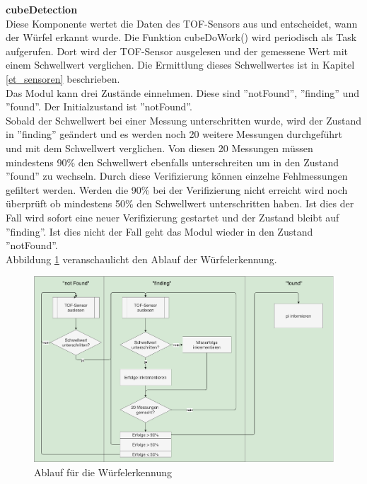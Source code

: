 \documentclass[../../main.tex]{subfiles}
\begin{document}
    \textbf{cubeDetection}\\
    Diese Komponente wertet die Daten des TOF-Sensors aus und entscheidet, wann der Würfel erkannt wurde. Die Funktion cubeDoWork() wird periodisch als Task aufgerufen. Dort wird der TOF-Sensor ausgelesen und der gemessene Wert mit einem Schwellwert verglichen. Die Ermittlung dieses Schwellwertes ist in Kapitel \ref{et_sensoren} beschrieben.\\
    Das Modul kann drei Zustände einnehmen. Diese sind ''notFound'', ''finding'' und ''found''. Der Initialzustand ist ''notFound''.\\
    Sobald der Schwellwert bei einer Messung unterschritten wurde, wird der Zustand in ''finding'' geändert und es werden noch 20 weitere Messungen durchgeführt und mit dem Schwellwert verglichen. Von diesen 20 Messungen müssen mindestens 90\% den Schwellwert ebenfalls unterschreiten um in den Zustand ''found'' zu wechseln. Durch diese Verifizierung können einzelne Fehlmessungen gefiltert werden. Werden die 90\% bei der Verifizierung nicht erreicht wird noch überprüft ob mindestens 50\% den Schwellwert unterschritten haben. Ist dies der Fall wird sofort eine neuer Verifizierung gestartet und der Zustand bleibt auf ''finding''. Ist dies nicht der Fall geht das Modul wieder in den Zustand ''notFound''.\\
    Abbildung \ref{fig:et_cube_detection_proc} veranschaulicht den Ablauf der Würfelerkennung.

    \begin{figure}[H]
        \centering
        \includegraphics[width=1.0\textwidth]{../../images/et/et_cube_detection_proc.pdf}
        \caption {Ablauf für die Würfelerkennung}
        \label{fig:et_cube_detection_proc}
    \end{figure}
\end{document}
